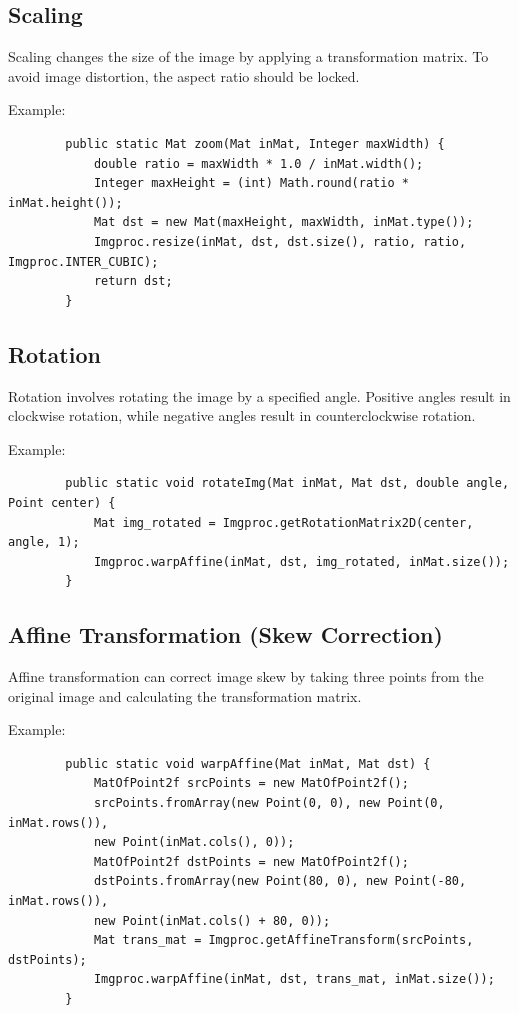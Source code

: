 \documentclass{article}
\begin{document}
	\subsection{Scaling}
	Scaling changes the size of the image by applying a transformation matrix. To avoid image distortion, the aspect ratio should be locked.
	
	Example:
	\begin{verbatim}
		public static Mat zoom(Mat inMat, Integer maxWidth) {
			double ratio = maxWidth * 1.0 / inMat.width();
			Integer maxHeight = (int) Math.round(ratio * inMat.height());
			Mat dst = new Mat(maxHeight, maxWidth, inMat.type());
			Imgproc.resize(inMat, dst, dst.size(), ratio, ratio, Imgproc.INTER_CUBIC);
			return dst;
		}
	\end{verbatim}
	
	\subsection{Rotation}
	Rotation involves rotating the image by a specified angle. Positive angles result in clockwise rotation, while negative angles result in counterclockwise rotation.
	
	Example:
	\begin{verbatim}
		public static void rotateImg(Mat inMat, Mat dst, double angle, Point center) {
			Mat img_rotated = Imgproc.getRotationMatrix2D(center, angle, 1);
			Imgproc.warpAffine(inMat, dst, img_rotated, inMat.size());
		}
	\end{verbatim}
	
	\subsection{Affine Transformation (Skew Correction)}
	Affine transformation can correct image skew by taking three points from the original image and calculating the transformation matrix.
	
	Example:
	\begin{verbatim}
		public static void warpAffine(Mat inMat, Mat dst) {
			MatOfPoint2f srcPoints = new MatOfPoint2f();
			srcPoints.fromArray(new Point(0, 0), new Point(0, inMat.rows()), 
			new Point(inMat.cols(), 0));
			MatOfPoint2f dstPoints = new MatOfPoint2f();
			dstPoints.fromArray(new Point(80, 0), new Point(-80, inMat.rows()), 
			new Point(inMat.cols() + 80, 0));
			Mat trans_mat = Imgproc.getAffineTransform(srcPoints, dstPoints);
			Imgproc.warpAffine(inMat, dst, trans_mat, inMat.size());
		}
	\end{verbatim}
	
\end{document}
